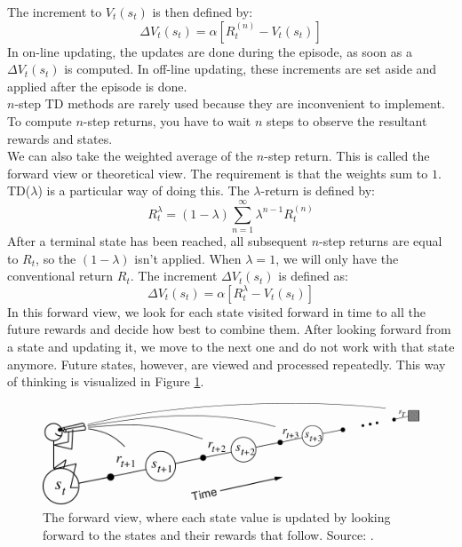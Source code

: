 The increment to $V_t(s_t)$ is then defined by:
\begin{equation}
\Delta V_t(s_t) = \alpha \left[ R_t^{(n)} - V_t(s_t) \right]
\end{equation}
In on-line updating, the updates are done during the episode, as soon as a $\Delta V_t(s_t)$ is computed. In off-line updating, these increments are set aside and applied after the episode is done.\\
$n$-step TD methods are rarely used because they are inconvenient to implement. To compute $n$-step returns, you have to wait $n$ steps to observe the resultant rewards and states.\\

We can also take the weighted average of the $n$-step return. This is called the forward view or theoretical view. The requirement is that the weights sum to $1$. TD($\lambda$) is a particular way of doing this. The $\lambda$-return is defined by:
\begin{equation}
R^\lambda_t = (1-\lambda) \sum_{n=1}^{\infty} \lambda^{n-1} R_t^{(n)}
\end{equation}
After a terminal state has been reached, all subsequent $n$-step returns are equal to $R_t$, so the $(1-\lambda)$ isn't applied. When $\lambda=1$, we will only have the conventional return $R_t$. The increment $\Delta V_t(s_t)$ is defined as:
\begin{equation}
\Delta V_t(s_t) = \alpha \left[ R_t^{\lambda} - V_t(s_t) \right]
\end{equation}
In this forward view, we look for each state visited forward in time to all the future rewards and decide how best to combine them. After looking forward from a state and updating it, we move to the next one and do not work with that state anymore. Future states, however, are viewed and processed repeatedly. This way of thinking is visualized in Figure \ref{fig:TDForwardView}.
\begin{figure}[htb]
\includegraphics[width=.9\linewidth]{images/TDForwardView.png}
\caption[TD forward view]{The forward view, where each state value is updated by looking forward to the states and their rewards that follow. Source: \cite{Sutton1998ReinforcementIntroduction}.}
\label{fig:TDForwardView}
\end{figure}

